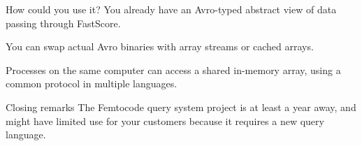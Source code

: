 \documentclass{beamer}
\begin{document}
\begin{frame}{How could you use it?}
\vspace{0.5 cm}
\large
You already have an Avro-typed abstract view of data passing through FastScore.

\vspace{0.5 cm}
You can swap actual Avro binaries with array streams or cached arrays.

\vspace{0.5 cm}
Processes on the same computer can access a shared in-memory array, using a common protocol in multiple languages.
\end{frame}

\begin{frame}{Closing remarks}
\vspace{0.5 cm}
\large
The Femtocode query system project is at least a year away, and might have limited use for your customers because it requires a new query language.

\vspace{0.5 cm}

\vspace{0.5 cm}

\vspace{0.25 cm}

\vspace{0.5 cm}
\end{frame}
\end{document}
